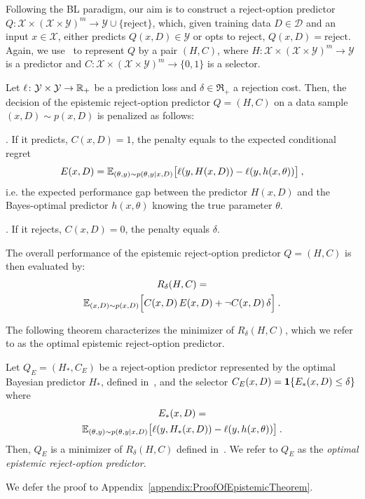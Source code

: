 Following the BL paradigm, our aim is to construct a reject-option predictor $Q \colon \mathcal{X} \times (\mathcal{X} \times \mathcal{Y})^m \rightarrow \mathcal{Y} \cup \{ \text{reject} \}$,  which, given training data $D \in \mathcal{D}$ and an input $x \in \mathcal{X}$, either predicts $Q(x, D) \in \mathcal{Y}$ or opts to reject, $Q(x, D) = \text{reject}$. Again, we use~ to represent $Q$ by a pair $(H,C)$, where  $H\colon \mathcal{X} \times (\mathcal{X} \times \mathcal{Y})^m \rightarrow \mathcal{Y}$ is a predictor and $C\colon \mathcal{X} \times (\mathcal{X} \times \mathcal{Y})^m \rightarrow \{0,1\}$ is a selector.

Let $\ell\colon{\cal Y}\times{\cal Y}\rightarrow\mathbb{R}_+$ be a prediction loss and $\delta\in\Re_+$ a rejection cost. Then, the decision of the epistemic reject-option predictor $Q=(H,C)$ on a data sample $(x,D)\sim p(x,D)$ is penalized as follows:

. If it predicts, $C(x,D)=1$, the penalty equals to the expected conditional regret
  \[
    E(x,D) = {\mathbb{E}}_{(\theta,y)\sim p(\theta,y|x,D)}\big [ \ell(y,H(x,D)) - \ell(y,h(x,\theta)) \big ]\:,
  \]
  i.e. the expected performance gap between the predictor $H(x,D)$ and the Bayes-optimal predictor $h(x,\theta)$ knowing the true parameter $\theta$.

. If it rejects, $C(x,D)=0$, the penalty equals $\delta$.

The overall performance of the epistemic reject-option predictor $Q=(H,C)$ is then evaluated by:
\begin{multline}
\label{equ:EpistemicRejOptObj}
   R_\delta(H,C)=\\ {\mathbb{E}}_{(x,D)\sim p(x,D)} \Big [C(x,D)\, E(x,D)+ \neg C(x,D)\,\delta 
       \Big ]    \:.
\end{multline}

The following theorem characterizes the minimizer of $R_\delta(H,C)$, which we refer to as the optimal epistemic reject-option predictor.
%
\begin{theorem}\label{thm:EpistemicRejOpt} Let $Q_E=(H_*,C_E)$ be a reject-option predictor represented by the optimal Bayesian predictor $H_*$, defined in~, and the selector $C_E(x,D) = \mathbf{1}{\{ { E_*(x,D) \leq \delta }\}}$
where 
\begin{multline}
  \label{equ:ConditionalRegret}
  E_*(x,D) = \\{\mathbb{E}}_{(\theta,y)\sim p(\theta,y|x,D)}\big [ \ell(y,H_*(x,D)) - \ell(y,h(x,\theta)) \big ]\:.
\end{multline}
%
Then, $Q_E$ is a minimizer of $R_\delta(H,C)$ defined in~. 
We refer to \(Q_E\) as the \emph{optimal epistemic reject-option predictor}.

\end{theorem}
%
We defer the proof to Appendix~\ref{appendix:ProofOfEpistemicTheorem}.

